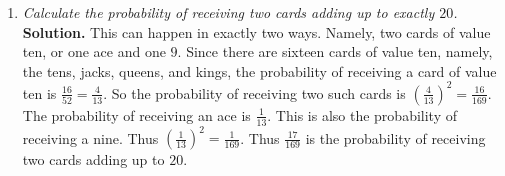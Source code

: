 \documentclass[12pt]{article}
\begin{document}
\begin{enumerate}
\item{\em Calculate the probability of receiving two
cards adding up to exactly $20$.}\\
{\bf Solution.} This can happen in exactly two ways. Namely,
two cards of value ten, or one ace and one $9$.
Since there are sixteen cards of value ten, namely,
the tens, jacks, queens, and kings, the probability of receiving
a card of value ten is $\frac{16}{52}=\frac{4}{13}$.
So the probability of receiving two such cards is
$\left(\frac{4}{13}\right)^2=\frac{16}{169}$.
The probability of receiving an ace is $\frac{1}{13}$.
This is also the probability of receiving a nine.
Thus $\left(\frac{1}{13}\right)^2=\frac{1}{169}$.
Thus $\frac{17}{169}$ is the probability of receiving two
cards adding up to $20$.

\end{enumerate}
\end{document}
